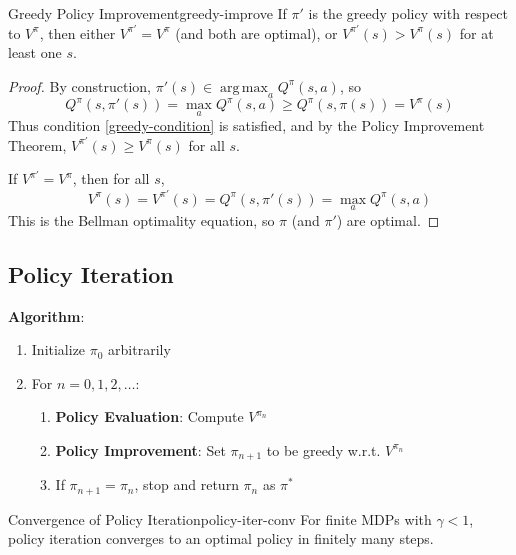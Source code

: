 \documentclass[a4paper, 11pt]{article}
\numberwithin{equation}{section}
\theoremstyle{plain}
\theoremstyle{definition}
\newcommand{\1}{{\mathbbm 1}}
\DeclareMathOperator*{\argmax}{arg\,max}
\begin{document}
	\begin{fprop}{Greedy Policy Improvement}{greedy-improve}
		If $\pi'$ is the greedy policy with respect to $V^{\pi}$, then either $V^{\pi'} = V^{\pi}$ (and both are optimal), or $V^{\pi'}(s) > V^{\pi}(s)$ for at least one $s$.
	\end{fprop}
	
	\begin{proof}
		By construction, $\pi'(s) \in \argmax_a Q^{\pi}(s, a)$, so
		\begin{equation*}
			Q^{\pi}(s, \pi'(s)) = \max_a Q^{\pi}(s, a) \geq Q^{\pi}(s, \pi(s)) = V^{\pi}(s)
		\end{equation*}
		Thus condition \eqref{greedy-condition} is satisfied, and by the Policy Improvement Theorem, $V^{\pi'}(s) \geq V^{\pi}(s)$ for all $s$.
		
		If $V^{\pi'} = V^{\pi}$, then for all $s$,
		\begin{equation*}
			V^{\pi}(s) = V^{\pi'}(s) = Q^{\pi}(s, \pi'(s)) = \max_a Q^{\pi}(s, a)
		\end{equation*}
		This is the Bellman optimality equation, so $\pi$ (and $\pi'$) are optimal.
	\end{proof}
	
	\subsection{Policy Iteration}
	
	\textbf{Algorithm}:
	\begin{enumerate}
		\item Initialize $\pi_0$ arbitrarily
		\item For $n = 0, 1, 2, \ldots$:
		\begin{enumerate}
			\item \textbf{Policy Evaluation}: Compute $V^{\pi_n}$
			\item \textbf{Policy Improvement}: Set $\pi_{n+1}$ to be greedy w.r.t. $V^{\pi_n}$
			\item If $\pi_{n+1} = \pi_n$, stop and return $\pi_n$ as $\pi^*$
		\end{enumerate}
	\end{enumerate}
	
	\begin{ftheo}{Convergence of Policy Iteration}{policy-iter-conv}
		For finite MDPs with $\gamma < 1$, policy iteration converges to an optimal policy in finitely many steps.
	\end{ftheo}
	
\end{document}

